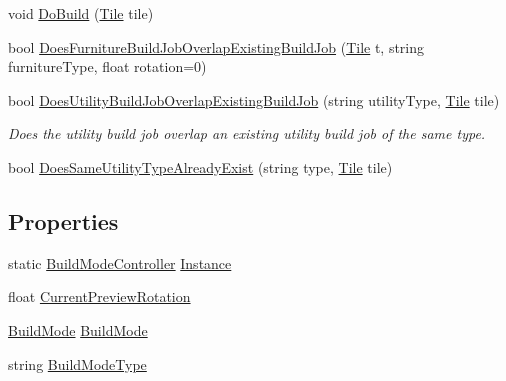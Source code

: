 \begin{DoxyCompactItemize}
\item 
void \hyperlink{class_build_mode_controller_acc5df17b8a7f94448334cf7e5a414b5b}{Do\+Build} (\hyperlink{class_tile}{Tile} tile)
\item 
bool \hyperlink{class_build_mode_controller_a2beedb8a4f48ee65488038473c180b50}{Does\+Furniture\+Build\+Job\+Overlap\+Existing\+Build\+Job} (\hyperlink{class_tile}{Tile} t, string furniture\+Type, float rotation=0)
\item 
bool \hyperlink{class_build_mode_controller_a701cb5c8326af048f78a511cf7c1c190}{Does\+Utility\+Build\+Job\+Overlap\+Existing\+Build\+Job} (string utility\+Type, \hyperlink{class_tile}{Tile} tile)
\begin{DoxyCompactList}\small\item\em Does the utility build job overlap an existing utility build job of the same type. \end{DoxyCompactList}\item 
bool \hyperlink{class_build_mode_controller_ab58a539a9a44498085bb28a63d8c4713}{Does\+Same\+Utility\+Type\+Already\+Exist} (string type, \hyperlink{class_tile}{Tile} tile)
\end{DoxyCompactItemize}
\subsection*{Properties}
\begin{DoxyCompactItemize}
\item 
static \hyperlink{class_build_mode_controller}{Build\+Mode\+Controller} \hyperlink{class_build_mode_controller_ae4e88a943b1c877701b9b1cd361761cd}{Instance}
\item 
float \hyperlink{class_build_mode_controller_a179a7474206bcddbf78d17574c1100dc}{Current\+Preview\+Rotation}
\item 
\hyperlink{_build_mode_controller_8cs_a9c6873c2efeb065f633a16b39a5841bd}{Build\+Mode} \hyperlink{class_build_mode_controller_ac6fdada4acb0019086133d0a14f588d5}{Build\+Mode}
\item 
string \hyperlink{class_build_mode_controller_a002aef1314c097a269c18c5b2e153b56}{Build\+Mode\+Type}
\end{DoxyCompactItemize}


